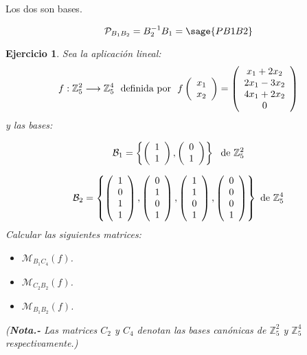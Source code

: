 \documentclass{amsart}
\newtheorem{ejer}{Ejercicio}
\def\z{\mathbb{Z}}
\begin{document}
Los dos son bases.

$$
	\mathcal{P}_{B_1B_2} = B_2^{-1} B_1 = \sage{PB1B2}
$$
 
\begin{ejer} Sea la aplicaci\'on lineal:
\[ f: \z ^2_5 \longrightarrow \z ^4_5 \ \ \hbox{definida por} \ \
f \left( \begin{array}{c}
x_1 \\ x_2             
\end{array} \right) = \left( \begin{array}{c}
x_1+2x_2 \\ 2x_1-3x_2 \\ 4x_1+2x_2 \\ 0      
\end{array} \right) \] y las bases:

 \[\mathcal{B}_1 = \left\lbrace \left( \begin{array}{c}
1 \\ 1            
\end{array} \right), 
\left( \begin{array}{c}
0 \\ 1            
\end{array} \right) \right\rbrace  \ \ \hbox{de}  \ \z ^2_5 \]

\[\mathcal{B}_2 = \left\lbrace \left( \begin{array}{c}
1 \\ 0 \\ 1 \\ 1            
\end{array} \right), 
\left( \begin{array}{c}
0 \\ 1 \\ 0 \\ 1           
\end{array} \right), 
\left( \begin{array}{c}
1 \\ 1 \\ 0 \\ 1           
\end{array} \right),
\left( \begin{array}{c}
0 \\ 0 \\ 0 \\ 1            
\end{array} \right) \right\rbrace \ \hbox{de}  \ \z ^4_5 \] Calcular las siguientes matrices:
\begin{itemize}
\item[a)] $\mathcal{M}_{B_1C_4}(f)$.
\item[b)] $\mathcal{M}_{C_2B_2}(f)$.
\item[c)] $\mathcal{M}_{B_1B_2}(f)$.
\end{itemize}

({\bf Nota.-} Las matrices $C_2$ y $C_4$ denotan las bases can\'onicas de $\z ^2_5$ y $\z ^4_5$ respectivamente.)
\end{ejer}
\end{document}
